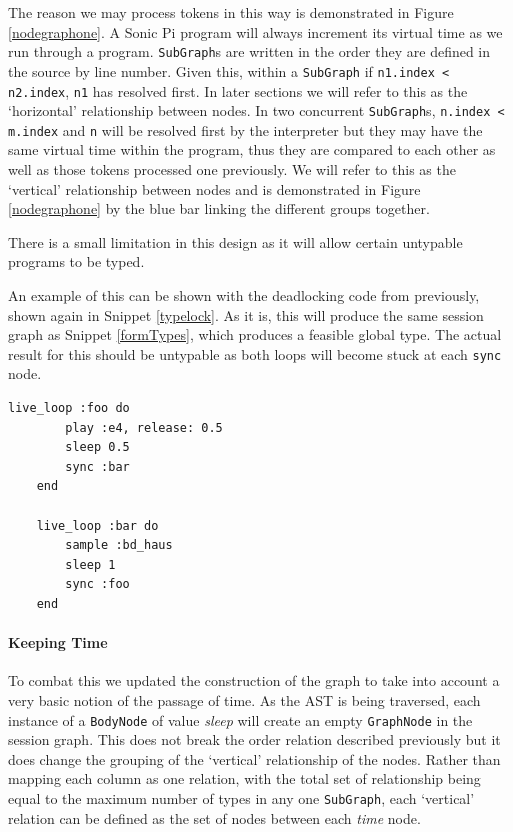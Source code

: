\documentclass[11pt, abstracton, twoside, titlepage=true]{scrartcl}
\begin{document}
The reason we may process tokens in this way is demonstrated in Figure 
\ref{nodegraphone}. A Sonic Pi program will always increment its virtual 
time as we run through a program. \texttt{SubGraph}s are written in the order 
they are defined in the source by line number. Given this, within a 
\texttt{SubGraph} if \texttt{n1.index < n2.index}, \texttt{n1} has resolved 
first. In later sections we will refer to this as the `horizontal' relationship 
between nodes. In two concurrent \texttt{SubGraph}s, \texttt{n.index < m.index} 
and \texttt{n} will be resolved first by the interpreter but they may have the 
same virtual time within the program, thus they are compared to each other as 
well as those tokens processed one previously. We will refer to this as the 
`vertical' relationship between nodes and is demonstrated in Figure 
\ref{nodegraphone} by the blue bar linking the different groups together.

There is a small limitation in this design as it will allow certain untypable
programs to be typed.

An example of this can be shown with the deadlocking code from previously,
shown again in Snippet \ref{typelock}. As it is, this will produce the same session
graph as Snippet \ref{formTypes}, which produces a feasible global type.
The actual result for this should be untypable as both loops will become stuck
at each \texttt{sync} node. 

\begin{minipage}{\textwidth}
	\begin{lstlisting}[style = sonicpi]
	live_loop :foo do
	    play :e4, release: 0.5
	    sleep 0.5
	    sync :bar
	end

	live_loop :bar do
	    sample :bd_haus
	    sleep 1
	    sync :foo
	end
	\end{lstlisting}
	 \label{typelock}
\end{minipage}

\paragraph{Keeping Time}
To combat this we updated the construction of the graph to take into account
a very basic notion of the passage of time. As the AST is being traversed, each
instance of a \texttt{BodyNode} of value \emph{sleep} will create an empty
\texttt{GraphNode} in the session graph. This does not break the order relation
described previously but it does change the grouping of the `vertical' 
relationship of the nodes. Rather than mapping each column as one relation, with
the total set of relationship being equal to the maximum number of types in
any one \texttt{SubGraph}, each `vertical' relation can be defined as the
set of nodes between each \emph{time} node.
\end{document}
